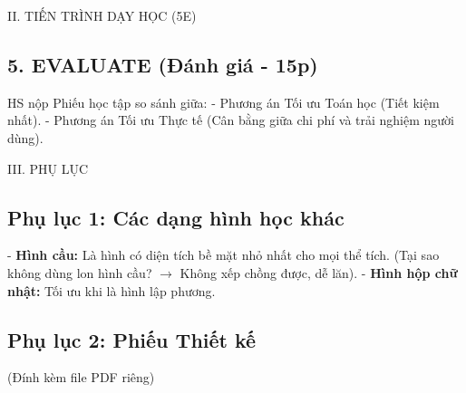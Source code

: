 \documentclass[12pt,a4paper]{article}
\begin{document}
\begin{sectionbox}{II. TIẾN TRÌNH DẠY HỌC (5E)}
\subsection*{5. EVALUATE (Đánh giá - 15p)}
HS nộp Phiếu học tập so sánh giữa:
- Phương án Tối ưu Toán học (Tiết kiệm nhất).
- Phương án Tối ưu Thực tế (Cân bằng giữa chi phí và trải nghiệm người dùng).
\end{sectionbox}

\newpage
\begin{sectionbox}{III. PHỤ LỤC}
\subsection*{Phụ lục 1: Các dạng hình học khác}
- \textbf{Hình cầu:} Là hình có diện tích bề mặt nhỏ nhất cho mọi thể tích. (Tại sao không dùng lon hình cầu? $\to$ Không xếp chồng được, dễ lăn).
- \textbf{Hình hộp chữ nhật:} Tối ưu khi là hình lập phương.

\subsection*{Phụ lục 2: Phiếu Thiết kế}
(Đính kèm file PDF riêng)
\end{sectionbox}
\end{document}

